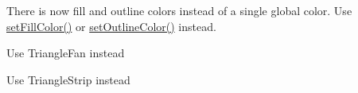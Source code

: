 \begin{DoxyRefList}
%
There is now fill and outline colors instead of a single global color. Use \mbox{\hyperlink{classsf_1_1Text_ab7bb3babac5a6da1802b2c3e1a3e6dcc}{set\+Fill\+Color()}} or \mbox{\hyperlink{classsf_1_1Text_aa19ec69c3b894e963602a6804ca68fe4}{set\+Outline\+Color()}} instead. 
\item[Member \mbox{\hyperlink{group__graphics_gga5ee56ac1339984909610713096283b1ba5338a2c6d922151fe50f235036af8a20}{sf\+::Triangles\+Fan}} ]\label{deprecated__deprecated000003}%
%
Use Triangle\+Fan instead  
\item[Member \mbox{\hyperlink{group__graphics_gga5ee56ac1339984909610713096283b1ba66643dbbb24bbacb405973ed80eebae0}{sf\+::Triangles\+Strip}} ]\label{deprecated__deprecated000002}%
%
Use Triangle\+Strip instead 
\end{DoxyRefList}